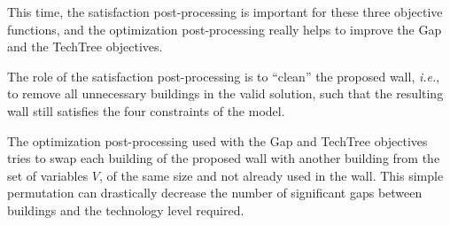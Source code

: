 \documentclass[journal]{IEEEtran}
\newcommand{\ie}{\textit{i.e.}}
\begin{document}
This  time, the  satisfaction post-processing  is important  for these
three objective functions, and the optimization post-processing really
helps to improve the Gap and the TechTree objectives.

The  role of  the  satisfaction post-processing  is  to ``clean''  the
proposed wall, \ie,  to remove all unnecessary buildings  in the valid
solution,  such  that the  resulting  wall  still satisfies  the  four
constraints of the model.

The  optimization  post-processing  used  with the  Gap  and  TechTree
objectives  tries to  swap each  building  of the  proposed wall  with
another building from  the set of variables $V$, of  the same size and
not already used in the  wall. This simple permutation can drastically
decrease  the number  of significant  gaps between  buildings and  the
technology level required.
\end{document}
